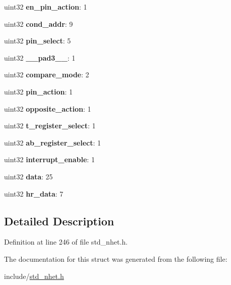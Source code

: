 \begin{DoxyCompactItemize}
\item 
\mbox{\label{structmov64__format_a5d0f98d2172bfa92cf418298a8e772f6}} 
uint32 {\bfseries en\+\_\+pin\+\_\+action}\+: 1
\item 
\mbox{\label{structmov64__format_a0698c6a0b7f242688b89f93e47342398}} 
uint32 {\bfseries cond\+\_\+addr}\+: 9
\item 
\mbox{\label{structmov64__format_a8a15bc67fd7f40a055f1d012de3f777a}} 
uint32 {\bfseries pin\+\_\+select}\+: 5
\item 
\mbox{\label{structmov64__format_a0e1c97920ab6ae0e061a46c1760d1bd7}} 
uint32 {\bfseries \+\_\+\+\_\+pad3\+\_\+\+\_\+}\+: 1
\item 
\mbox{\label{structmov64__format_a2775a447099409483d70ae91ede02bb1}} 
uint32 {\bfseries compare\+\_\+mode}\+: 2
\item 
\mbox{\label{structmov64__format_ac57d6a313ce9976a725004fb1359478f}} 
uint32 {\bfseries pin\+\_\+action}\+: 1
\item 
\mbox{\label{structmov64__format_ac01b03a312bb534818b600f21628eb2c}} 
uint32 {\bfseries opposite\+\_\+action}\+: 1
\item 
\mbox{\label{structmov64__format_a35697c9a148f466c933b0257d35633cf}} 
uint32 {\bfseries t\+\_\+register\+\_\+select}\+: 1
\item 
\mbox{\label{structmov64__format_ae1cea59e73a2e967325fcd7180372bca}} 
uint32 {\bfseries ab\+\_\+register\+\_\+select}\+: 1
\item 
\mbox{\label{structmov64__format_a5efb4f53a009d92be4c854dfff387805}} 
uint32 {\bfseries interrupt\+\_\+enable}\+: 1
\item 
\mbox{\label{structmov64__format_a5a7be409bb114bc05a16def19efffbea}} 
uint32 {\bfseries data}\+: 25
\item 
\mbox{\label{structmov64__format_a7183f46a98f4943ac7545c63ef77002a}} 
uint32 {\bfseries hr\+\_\+data}\+: 7
\end{DoxyCompactItemize}


\subsection{Detailed Description}


Definition at line 246 of file std\+\_\+nhet.\+h.



The documentation for this struct was generated from the following file\+:\begin{DoxyCompactItemize}
\item 
include/\mbox{\hyperlink{std__nhet_8h}{std\+\_\+nhet.\+h}}\end{DoxyCompactItemize}
